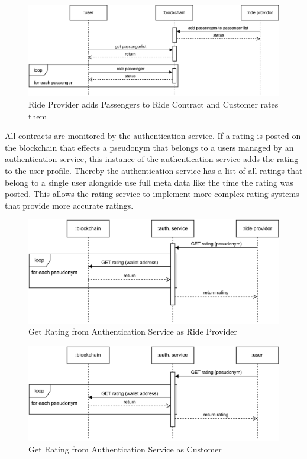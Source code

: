 \begin{figure}[h]
    \centering
    \includegraphics[width=\linewidth]{data/8.svg}
    \caption{Ride Provider adds Passengers to Ride Contract and Customer rates them}
    \label{fig:directSVG}
\end{figure}


All contracts are monitored by the authentication service. If a rating is posted on the blockchain that effects a pseudonym that belongs to a users managed by an authentication service, this instance of the authentication service adds the rating to the user profile. Thereby the authentication service has a list of all ratings that belong to a single user alongside use full meta data like the time the rating was posted. This allows the rating service to implement more complex rating systems that provide more accurate ratings.

\begin{figure}[h]
    \centering
    \includegraphics[width=\linewidth]{data/7.svg}
    \caption{Get Rating from Authentication Service as Ride Provider}
    \label{fig:directSVG}
\end{figure}

\begin{figure}[h]
    \centering
    \includegraphics[width=\linewidth]{data/9.svg}
    \caption{Get Rating from Authentication Service as Customer}
    \label{fig:directSVG}
\end{figure}


